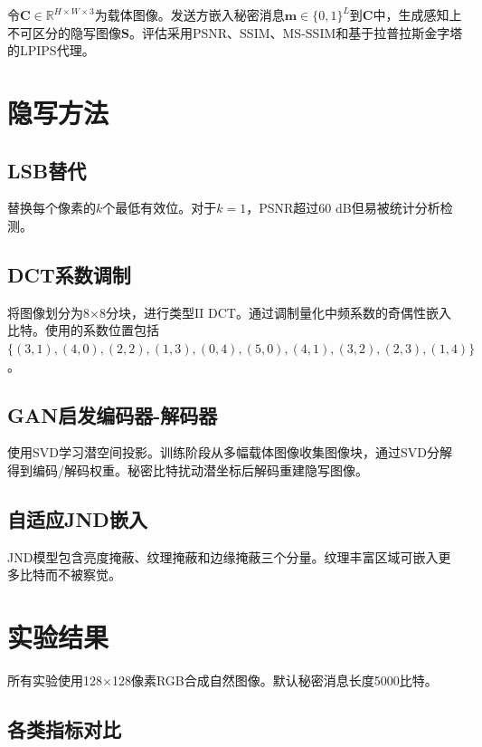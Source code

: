 \documentclass[conference]{IEEEtran}
\begin{document}
令$\mathbf{C} \in \mathbb{R}^{H \times W \times 3}$为载体图像。发送方嵌入秘密消息$\mathbf{m} \in \{0,1\}^L$到$\mathbf{C}$中，生成感知上不可区分的隐写图像$\mathbf{S}$。评估采用PSNR、SSIM、MS-SSIM和基于拉普拉斯金字塔的LPIPS代理。

\section{隐写方法}
\label{sec:methods}

\subsection{LSB替代}

替换每个像素的$k$个最低有效位。对于$k=1$，PSNR超过60 dB但易被统计分析检测。

\subsection{DCT系数调制}

将图像划分为8$\times$8分块，进行类型II DCT。通过调制量化中频系数的奇偶性嵌入比特。使用的系数位置包括$\{(3,1), (4,0), (2,2), (1,3), (0,4), (5,0), (4,1), (3,2), (2,3), (1,4)\}$。

\subsection{GAN启发编码器-解码器}

使用SVD学习潜空间投影。训练阶段从多幅载体图像收集图像块，通过SVD分解得到编码/解码权重。秘密比特扰动潜坐标后解码重建隐写图像。

\subsection{自适应JND嵌入}

JND模型包含亮度掩蔽、纹理掩蔽和边缘掩蔽三个分量。纹理丰富区域可嵌入更多比特而不被察觉。

\section{实验结果}
\label{sec:results}

所有实验使用128$\times$128像素RGB合成自然图像。默认秘密消息长度5000比特。

\subsection{各类指标对比}
\end{document}
